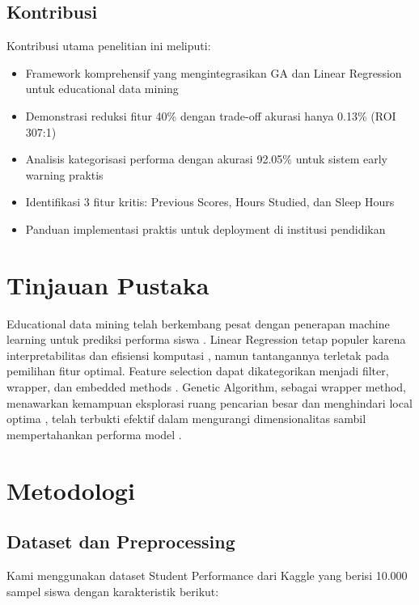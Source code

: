 \documentclass[conference]{IEEEtran}
\begin{document}
\subsection{Kontribusi}
Kontribusi utama penelitian ini meliputi:
\begin{itemize}
    \item Framework komprehensif yang mengintegrasikan GA dan Linear Regression untuk educational data mining
    \item Demonstrasi reduksi fitur 40\% dengan trade-off akurasi hanya 0.13\% (ROI 307:1)
    \item Analisis kategorisasi performa dengan akurasi 92.05\% untuk sistem early warning praktis
    \item Identifikasi 3 fitur kritis: Previous Scores, Hours Studied, dan Sleep Hours
    \item Panduan implementasi praktis untuk deployment di institusi pendidikan
\end{itemize}

\section{Tinjauan Pustaka}

Educational data mining telah berkembang pesat dengan penerapan machine learning untuk prediksi performa siswa \cite{romero2010educational}. Linear Regression tetap populer karena interpretabilitas dan efisiensi komputasi \cite{cortez2008using}, namun tantangannya terletak pada pemilihan fitur optimal. Feature selection dapat dikategorikan menjadi filter, wrapper, dan embedded methods \cite{guyon2003introduction}. Genetic Algorithm, sebagai wrapper method, menawarkan kemampuan eksplorasi ruang pencarian besar dan menghindari local optima \cite{xue2016survey}, telah terbukti efektif dalam mengurangi dimensionalitas sambil mempertahankan performa model \cite{goldberg1989genetic}.

\section{Metodologi}

\subsection{Dataset dan Preprocessing}

Kami menggunakan dataset Student Performance dari Kaggle yang berisi 10.000 sampel siswa dengan karakteristik berikut:
\end{document}

